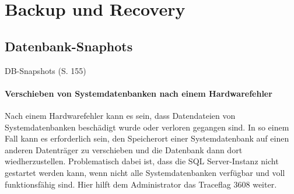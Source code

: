   \chapter{Backup und Recovery}
    \chaptertoc{}
    \cleardoubleevenpage
    
    \section{Datenbank-Snaphots}
  DB-Snapshots (S. 155)
          \subsubsection{Verschieben von Systemdatenbanken nach einem Hardwarefehler}
            Nach einem Hardwarefehler kann es sein, dass Datendateien von
            Systemdatenbanken beschädigt wurde oder verloren gegangen sind. In
            so einem Fall kann es erforderlich sein, den Speicherort einer
            Systemdatenbank auf einen anderen Datenträger zu verschieben und die
            Datenbank dann dort wiedherzustellen. Problematisch dabei ist, dass
            die SQL Server-Instanz nicht gestartet werden kann, wenn nicht alle
            Systemdatenbanken verfügbar und voll funktionsfähig sind. Hier hilft
            dem Administrator das Traceflag 3608 weiter.

